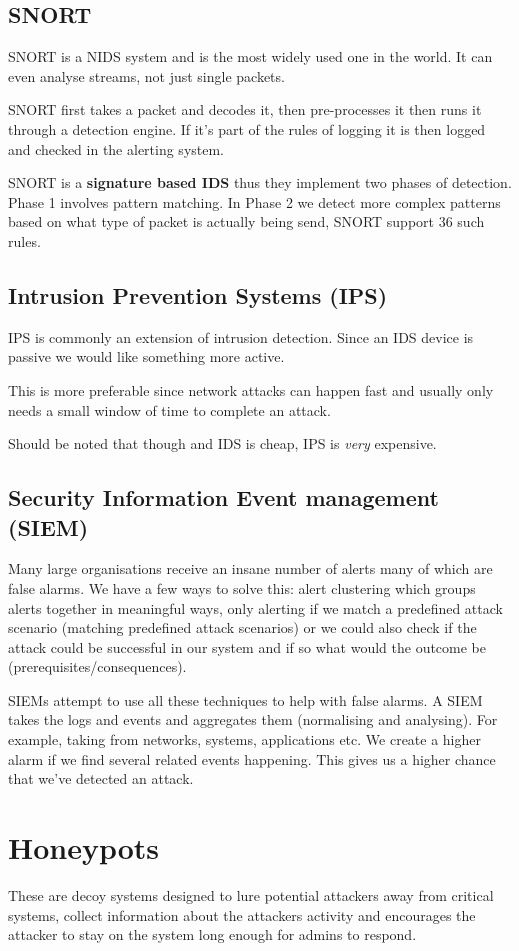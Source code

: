 \documentclass{report}
\begin{document}
\subsection{SNORT}
SNORT is a NIDS system and is the most widely used one in the world. It can
even analyse streams, not just single packets.

SNORT first takes a packet and decodes it, then pre-processes it then runs it
through a detection engine. If it's part of the rules of logging it is then
logged and checked in the alerting system.

SNORT is a \textbf{signature based IDS}
thus they implement two phases of detection.
Phase 1 involves pattern matching. In Phase 2 we detect more complex patterns
based on what type of packet is actually being send, SNORT support 36 such
rules.

\subsection{Intrusion Prevention Systems (IPS)}
IPS is commonly an extension of intrusion detection. Since an IDS device is
passive we would like something more active.

This is more preferable since network attacks can happen fast and usually
only needs a small window of time to complete an attack.

Should be noted that though and IDS is cheap, IPS is \emph{very} expensive.

\subsection{Security Information Event management (SIEM)}
Many large organisations receive an insane number of alerts many of which are
false alarms. We have a few ways to solve this:
alert clustering which groups alerts together in meaningful ways,
only alerting if we match a predefined attack scenario (matching predefined
attack scenarios) or
we could also check if the attack could be successful in our system
and if so what would the outcome be (prerequisites/consequences).

SIEMs attempt to use all these techniques to help with false alarms.
A SIEM takes the logs and events and aggregates them (normalising and
analysing). For example, taking from networks, systems, applications etc.
We create a higher alarm if we find several related events happening.
This gives us a higher chance that we've detected an attack.

\section{Honeypots}
These are decoy systems designed to lure potential attackers away from
critical systems, collect information about the attackers activity
and encourages the attacker to stay on the system long enough for
admins to respond.
\end{document}
